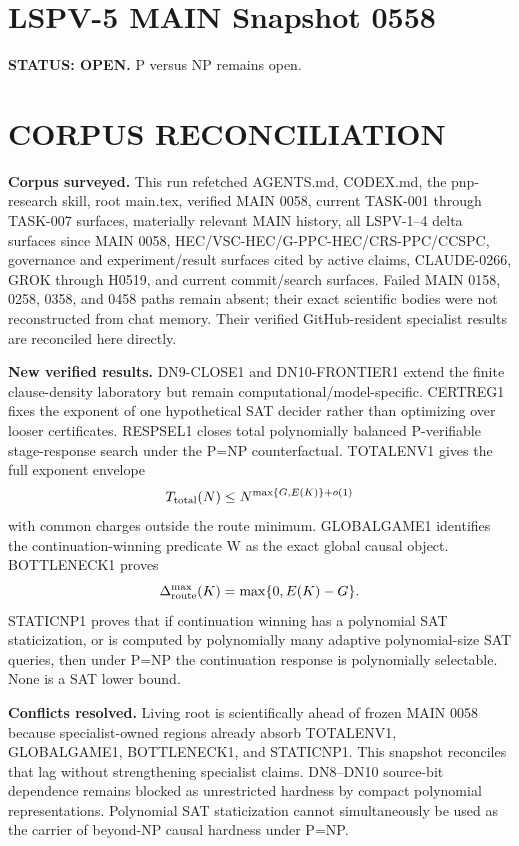 \documentclass[11pt]{article}
\begin{document}
\section*{LSPV-5 MAIN Snapshot 0558}
\textbf{STATUS: OPEN.} P versus NP remains open.

\section*{CORPUS RECONCILIATION}
\textbf{Corpus surveyed.}
This run refetched AGENTS.md, CODEX.md, the pnp-research skill, root main.tex, verified MAIN 0058, current TASK-001 through TASK-007 surfaces, materially relevant MAIN history, all LSPV-1--4 delta surfaces since MAIN 0058, HEC/VSC-HEC/G-PPC-HEC/CRS-PPC/CCSPC, governance and experiment/result surfaces cited by active claims, CLAUDE-0266, GROK through H0519, and current commit/search surfaces. Failed MAIN 0158, 0258, 0358, and 0458 paths remain absent; their exact scientific bodies were not reconstructed from chat memory. Their verified GitHub-resident specialist results are reconciled here directly.

\textbf{New verified results.}
DN9-CLOSE1 and DN10-FRONTIER1 extend the finite clause-density laboratory but remain computational/model-specific. CERTREG1 fixes the exponent of one hypothetical SAT decider rather than optimizing over looser certificates. RESPSEL1 closes total polynomially balanced P-verifiable stage-response search under the P=NP counterfactual. TOTALENV1 gives the full exponent envelope
\[
T_{\rm total}(N)\le N^{\max\{G,E(K)\}+o(1)}
\]
with common charges outside the route minimum. GLOBALGAME1 identifies the continuation-winning predicate W as the exact global causal object. BOTTLENECK1 proves
\[
\Delta_{\rm route}^{\max}(K)=\max\{0,E(K)-G\}.
\]
STATICNP1 proves that if continuation winning has a polynomial SAT staticization, or is computed by polynomially many adaptive polynomial-size SAT queries, then under P=NP the continuation response is polynomially selectable. None is a SAT lower bound.

\textbf{Conflicts resolved.}
Living root is scientifically ahead of frozen MAIN 0058 because specialist-owned regions already absorb TOTALENV1, GLOBALGAME1, BOTTLENECK1, and STATICNP1. This snapshot reconciles that lag without strengthening specialist claims. DN8--DN10 source-bit dependence remains blocked as unrestricted hardness by compact polynomial representations. Polynomial SAT staticization cannot simultaneously be used as the carrier of beyond-NP causal hardness under P=NP.
\end{document}
